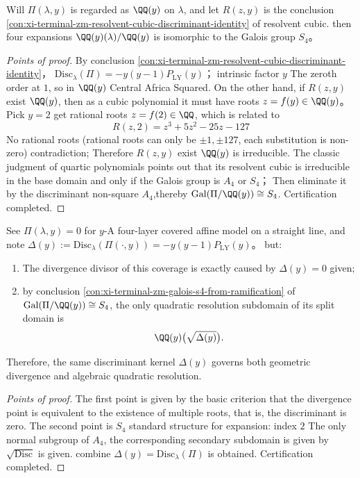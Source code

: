 \begin{conclusion}\label{con:xi-terminal-zm-galois-s4-from-ramification}
Will \(\Pi(\lambda,y)\) is regarded as \(\QQ(y)\) on \(\lambda\), and let \(R(z,y)\) is the conclusion \ref{con:xi-terminal-zm-resolvent-cubic-discriminant-identity} of resolvent cubic.
then four expansions \(\QQ(y)(\lambda)/\QQ(y)\) is isomorphic to the Galois group \(S_{4}\)。
\end{conclusion}
\begin{proof}[Points of proof]
By conclusion \ref{con:xi-terminal-zm-resolvent-cubic-discriminant-identity}，
\(
\mathrm{Disc}_{\lambda}(\Pi)=-y(y-1)P_{\mathrm{LY}}(y)
\)；
intrinsic factor \(y\) The zeroth order at \(1\), so in \(\QQ(y)\) Central Africa Squared.
On the other hand, if \(R(z,y)\) exist \(\QQ(y)\), then as a cubic polynomial it must have roots \(z=f(y)\in\QQ(y)\)。
Pick \(y=2\) get rational roots \(z=f(2)\in\QQ\), which is related to
\[
R(z,2)=z^{3}+5z^{2}-25z-127
\]
No rational roots (rational roots can only be \(\pm1,\pm127\), each substitution is non-zero) contradiction;
Therefore \(R(z,y)\) exist \(\QQ(y)\) is irreducible.
The classic judgment of quartic polynomials points out that its resolvent cubic is irreducible in the base domain and only if the Galois group is \(A_{4}\) or \(S_{4}\)；
Then eliminate it by the discriminant non-square \(A_{4}\),thereby \(\mathrm{Gal}(\Pi/\QQ(y))\cong S_{4}\). Certification completed.
\end{proof}

\begin{conclusion}\label{con:xi-terminal-zm-discriminant-dual-role}
See \(\Pi(\lambda,y)=0\) for \(y\)-A four-layer covered affine model on a straight line, and note
\(
\Delta(y):=\mathrm{Disc}_{\lambda}(\Pi(\cdot,y))=-y(y-1)P_{\mathrm{LY}}(y)
\)。
but:
\begin{enumerate}
  \item The divergence divisor of this coverage is exactly caused by \(\Delta(y)=0\) given;
  \item by conclusion \ref{con:xi-terminal-zm-galois-s4-from-ramification} of \(\mathrm{Gal}(\Pi/\QQ(y))\cong S_{4}\), the only quadratic resolution subdomain of its split domain is
  \[
  \QQ(y)\bigl(\sqrt{\Delta(y)}\bigr).
  \]
\end{enumerate}
Therefore, the same discriminant kernel \(\Delta(y)\) governs both geometric divergence and algebraic quadratic resolution.
\end{conclusion}
\begin{proof}[Points of proof]
The first point is given by the basic criterion that the divergence point is equivalent to the existence of multiple roots, that is, the discriminant is zero.
The second point is \(S_{4}\) standard structure for expansion: index \(2\) The only normal subgroup of \(A_{4}\), the corresponding secondary subdomain is given by \(\sqrt{\mathrm{Disc}}\) is given.
combine \(\Delta(y)=\mathrm{Disc}_{\lambda}(\Pi)\) is obtained. Certification completed.
\end{proof}

